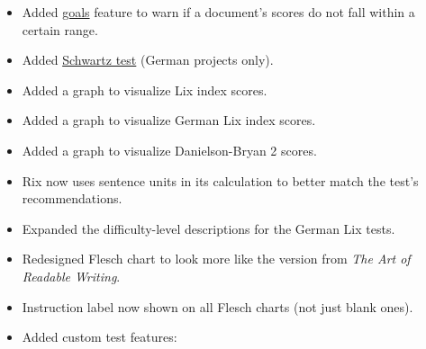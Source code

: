 \documentclass[
]{book}
\providecommand{\tightlist}{%
  \setlength{\itemsep}{0pt}\setlength{\parskip}{0pt}}
\theoremstyle{definition}
\theoremstyle{definition}
\theoremstyle{definition}
\theoremstyle{definition}
\theoremstyle{remark}
\begin{document}
\begin{itemize}
\tightlist
\item
  Added \protect\hyperlink{reviewing-goals}{goals} feature to warn if a document's scores do not fall within a certain range.
\item
  Added \protect\hyperlink{scwartz}{Schwartz test} (German projects only).
\item
  Added a graph to visualize Lix index scores.
\item
  Added a graph to visualize German Lix index scores.
\item
  Added a graph to visualize Danielson-Bryan 2 scores.
\item
  Rix now uses sentence units in its calculation to better match the test's recommendations.
\item
  Expanded the difficulty-level descriptions for the German Lix tests.
\item
  Redesigned Flesch chart to look more like the version from \emph{The Art of Readable Writing}.
\item
  Instruction label now shown on all Flesch charts (not just blank ones).
\item
  Added custom test features:


\end{itemize}
\end{document}
